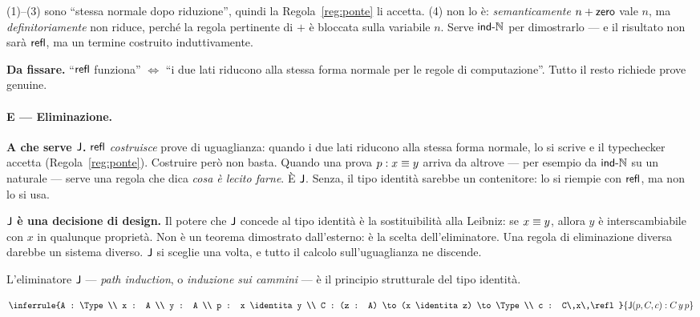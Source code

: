 \noindent (1)--(3) sono ``stessa normale dopo riduzione'', quindi la Regola~\ref{reg:ponte} li accetta. (4) non lo \`e: \emph{semanticamente} $n + \mathsf{zero}$ vale $n$, ma \emph{definitoriamente} non riduce, perch\'e la regola pertinente di $+$ \`e bloccata sulla variabile $n$. Serve $\mathsf{ind\text{-}\mathbb{N}}$ per dimostrarlo --- e il risultato non sar\`a $\mathsf{refl}$, ma un termine costruito induttivamente.

\medskip

\noindent\textbf{Da fissare.} ``$\mathsf{refl}$ funziona'' $\iff$ ``i due lati riducono alla stessa forma normale per le regole di computazione''. Tutto il resto richiede prove genuine.

\paragraph{E --- Eliminazione.}

\noindent\textbf{A che serve $\mathsf{J}$.} $\mathsf{refl}$ \emph{costruisce} prove di uguaglianza: quando i due lati riducono alla stessa forma normale, lo si scrive e il typechecker accetta (Regola~\ref{reg:ponte}). Costruire per\`o non basta. Quando una prova $p : x \equiv y$ arriva da altrove --- per esempio da $\mathsf{ind\text{-}\mathbb{N}}$ su un naturale --- serve una regola che dica \emph{cosa \`e lecito farne}. \`E $\mathsf{J}$. Senza, il tipo identit\`a sarebbe un contenitore: lo si riempie con $\mathsf{refl}$, ma non lo si usa.

\medskip

\noindent\textbf{$\mathsf{J}$ \`e una decisione di design.} Il potere che $\mathsf{J}$ concede al tipo identit\`a \`e la sostituibilit\`a alla Leibniz: se $x \equiv y$, allora $y$ \`e interscambiabile con $x$ in qualunque propriet\`a. Non \`e un teorema dimostrato dall'esterno: \`e la scelta dell'eliminatore. Una regola di eliminazione diversa darebbe un sistema diverso. $\mathsf{J}$ si sceglie una volta, e tutto il calcolo sull'uguaglianza ne discende.

\medskip

L'eliminatore $\mathsf{J}$ --- \emph{path induction}, o \emph{induzione sui cammini} --- \`e il principio strutturale del tipo identit\`a.

\[
\inferrule{A : \Type \\ x : A \\ y : A \\ p : x \identita y \\
C : (z : A) \to (x \identita z) \to \Type \\
c : C\,x\,\refl}{\Jelim(p, C, c) : C\,y\,p}
\]

